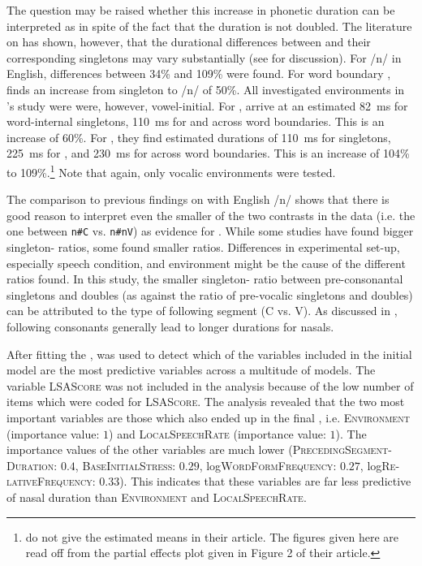 The question may be raised whether this increase in phonetic duration can be interpreted as  in spite of the fact that the duration is not doubled. The literature on  has shown, however, that the durational differences between  and their corresponding singletons may vary substantially (see  for discussion). 
For /n/ in English, differences between 34\% and 109\% were found. For word boundary , \cite{Delattre.} finds  an increase from singleton to  /n/ of 50\%.  All investigated environments in \citeauthor{Delattre.}'s study were were, however, vowel-initial.  For , \citet[86, Figure 2]{Oh.2012} arrive at an estimated 82~ms for word-internal singletons, 110~ms for  and  across word boundaries. This is an increase of 60\%. For , they find estimated durations of 110~ms for singletons, 225~ms for , and 230~ms for  across word boundaries. This is an increase of 104\% to 109\%.\footnote{\citet{Oh.2012} do not give the estimated means in their article. The figures given here are read off from the partial effects plot given in Figure 2 of their article.} Note that again, only vocalic environments were tested.

The comparison to previous findings on  with English /n/ shows that there is good reason to interpret even the smaller of the two contrasts in the data (i.e. the one between \texttt{n\#C} vs. \texttt{n\#nV}) as evidence for . While some studies have found bigger singleton- ratios, some found smaller ratios. Differences in experimental set-up, especially speech condition, and  environment might be the cause of the different ratios found. In this study, the smaller singleton- ratio between pre-consonantal singletons and doubles  (as against the ratio of pre-vocalic singletons and doubles) can be attributed to the type of following segment (C vs. V). As discussed in , following consonants generally lead to longer durations for nasals.

After fitting the ,  was used to detect which of the variables included in the initial model are the most predictive variables across a multitude of models. The variable \textsc{LSAScore} was not included in the  analysis because of the low number of items which were coded for \textsc{LSAScore}. 
The analysis revealed that the two most important variables are those which also ended up in the final , i.e. \textsc{Environment} (importance value: $1$) and \textsc{LocalSpeechRate} (importance value: $1$).  The importance values of the other variables are much lower (\textsc{PrecedingSegment-Duration}:  $0.4$, \textsc{BaseInitialStress}: $0.29$, log\textsc{WordFormFrequency}: $0.27$, log\textsc{Re-lativeFrequency}: $0.33$). This indicates that these variables are far less predictive of nasal duration than \textsc{Environment} and \textsc{LocalSpeechRate}. 


